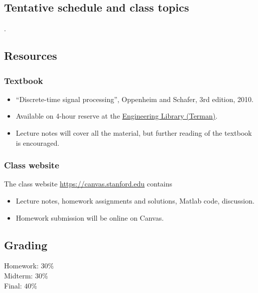 \documentclass[10pt]{article}
\begin{document}
\subsection*{Tentative schedule and class topics}



.

\subsection*{Resources}

\subsubsection*{Textbook}
\begin{itemize}
	\item ``Discrete-time signal processing'', Oppenheim and Schafer, 3rd edition, 2010.
	\item Available on 4-hour reserve at the \href{https://campus-map.stanford.edu/?id=04-080&lat=37.42787956&lng=-122.17429865&zoom=17&srch=engineeri}{Engineering Library (Terman)}.
	\item Lecture notes will cover all the material, but further reading of the textbook is encouraged.
\end{itemize}

\subsubsection*{Class website}

The class website \href{https://canvas.stanford.edu}{https://canvas.stanford.edu} contains

\begin{itemize}
	\item Lecture notes, homework assignments and solutions, Matlab code, discussion.
	\item Homework submission will be online on Canvas.
\end{itemize}

\subsection*{Grading}
Homework: $30\%$ \\
Midterm: $30\%$ \\
Final: $40\%$ 
\end{document}
